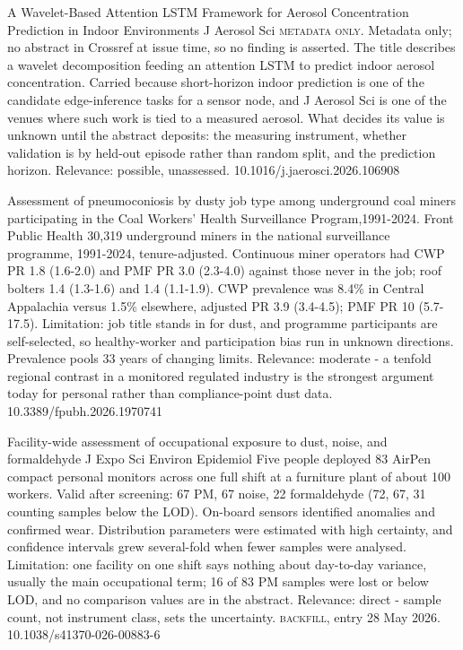 \documentclass[10pt]{article}
\begin{document}
{A Wavelet-Based Attention LSTM Framework for Aerosol Concentration Prediction in Indoor Environments}
{J Aerosol Sci}
{\textsc{metadata only.} Metadata only; no abstract in Crossref at issue time, so no finding is asserted. The title describes a wavelet decomposition feeding an attention LSTM to predict indoor aerosol concentration. Carried because short-horizon indoor prediction is one of the candidate edge-inference tasks for a sensor node, and J Aerosol Sci is one of the venues where such work is tied to a measured aerosol. What decides its value is unknown until the abstract deposits: the measuring instrument, whether validation is by held-out episode rather than random split, and the prediction horizon. Relevance: possible, unassessed.}
{10.1016/j.jaerosci.2026.106908}

\par{}\baselineskip{}\baselineskip
{}

{Assessment of pneumoconiosis by dusty job type among underground coal miners participating in the Coal Workers' Health Surveillance Program,1991-2024.}
{Front Public Health}
{30,319 underground miners in the national surveillance programme, 1991-2024, tenure-adjusted. Continuous miner operators had CWP PR 1.8 (1.6-2.0) and PMF PR 3.0 (2.3-4.0) against those never in the job; roof bolters 1.4 (1.3-1.6) and 1.4 (1.1-1.9). CWP prevalence was 8.4\% in Central Appalachia versus 1.5\% elsewhere, adjusted PR 3.9 (3.4-4.5); PMF PR 10 (5.7-17.5). Limitation: job title stands in for dust, and programme participants are self-selected, so healthy-worker and participation bias run in unknown directions. Prevalence pools 33 years of changing limits. Relevance: moderate - a tenfold regional contrast in a monitored regulated industry is the strongest argument today for personal rather than compliance-point dust data.}
{10.3389/fpubh.2026.1970741}

{Facility-wide assessment of occupational exposure to dust, noise, and formaldehyde}
{J Expo Sci Environ Epidemiol}
{Five people deployed 83 AirPen compact personal monitors across one full shift at a furniture plant of about 100 workers. Valid after screening: 67 PM, 67 noise, 22 formaldehyde (72, 67, 31 counting samples below the LOD). On-board sensors identified anomalies and confirmed wear. Distribution parameters were estimated with high certainty, and confidence intervals grew several-fold when fewer samples were analysed. Limitation: one facility on one shift says nothing about day-to-day variance, usually the main occupational term; 16 of 83 PM samples were lost or below LOD, and no comparison values are in the abstract. Relevance: direct - sample count, not instrument class, sets the uncertainty. \textsc{backfill}, entry 28 May 2026.}
{10.1038/s41370-026-00883-6}
\end{document}
